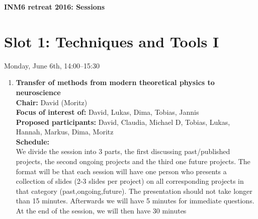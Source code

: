 \documentclass[10pt, a4paper,twoside,american]{article}
\newcommand{\maintitle}{INM6 retreat 2016}
\newcommand{\shorttitle}{Sessions}
\begin{document}
\noindent
\thispagestyle{empty}
\parbox{\textwidth}{\centering
 {\huge\bf \maintitle: \shorttitle}}
%
\vspace*{1cm}
\noindent
\section*{Slot 1: Techniques and Tools I}
Monday, June 6th, 14:00--15:30

\begin{enumerate}[resume]
\item {\large\bf Transfer of methods from modern theoretical physics to neuroscience}\\[1ex]
  {\bf Chair:} David (Moritz)\\[1ex]
  {\bf Focus of interest of:} David, Lukas, Dima, Tobias, Jannis\\[1ex]
  {\bf Proposed participants:} David, Claudia, Michael D, Tobias, Lukas, Hannah, Markus, Dima, Moritz\\[1ex]
  {\bf Schedule:}\\[1ex]
  We divide the session into 3 parts, the first discussing
  past/published projects, the second ongoing projects and the third
  one future projects. The format will be that each session will have
  one person who presents a collection of slides (2-3 slides per
  project) on all corresponding projects in that category
  (past,ongoing,future). The presentation should not take longer than
  15 minutes. Afterwards we will have 5 minutes for immediate
  questions. At the end of the session, we will then have 30 minutes

\end{enumerate}
\end{document}
